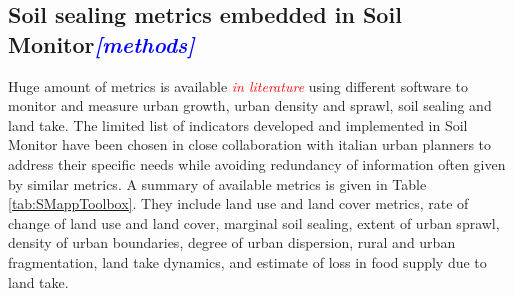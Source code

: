 \documentclass[APA,LATO1COL,doublespace]{WileyNJD-v2}
\newcommand{\toberevised}[1]{\emph{\textcolor{red}{#1}}} %
\newcommand{\update}[1]{\emph{\textcolor{blue}{#1}}}     %
\begin{document}
\subsection{Soil sealing metrics embedded in Soil Monitor\update{[methods]}} \label{sec:metrics}
Huge amount of metrics is available \toberevised{in literature} using different software to monitor and measure urban growth, urban density and sprawl, soil sealing and land take.
The limited list of indicators developed and implemented in Soil Monitor have been chosen in close collaboration with italian urban planners to address their specific needs while avoiding redundancy of information often given by similar metrics. 
A summary of available metrics is given in Table \ref{tab:SMappToolbox}.
They include land use and land cover metrics, rate of change of land use and land cover, marginal soil sealing, extent of urban sprawl, density of urban boundaries, degree of urban dispersion, rural and urban fragmentation, land take dynamics, and estimate of loss in food supply due to land take. 
\end{document}

